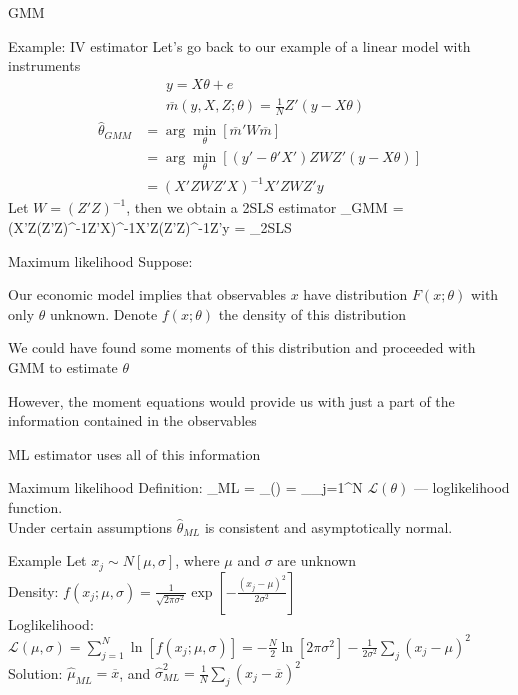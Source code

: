\begin{frame}{GMM}
	\begin{block}{Example: IV estimator}
	Let's go back to our example of a linear model with instruments
	\begin{align*}
		&y = X\theta + e\\
		&\overline{m}(y, X,Z; \theta) = \frac{1}{N}Z'(y-X\theta)
	\end{align*}
	\begin{align*}
		\widehat{\theta}_{GMM} &= \arg\min_\theta\left[\overline{m}'W\overline{m}\right]\\
		&= \arg\min_\theta\left[(y'-\theta'X')ZWZ'(y-X\theta)\right]\\
		& = \left(X'ZWZ'X\right)^{-1}X'ZWZ'y
	\end{align*}
	Let $W = \left(Z'Z\right)^{-1}$, then we obtain a 2SLS estimator
	\be
		\widehat{\theta}_{GMM} = \left(X'Z\left(Z'Z\right)^{-1}Z'X\right)^{-1}X'Z\left(Z'Z\right)^{-1}Z'y = \widehat\theta_{2SLS}
	\ee
	\end{block}
\end{frame}

\begin{frame}{Maximum likelihood}
	Suppose:
	\bi
		\item{Our economic model implies that observables $x$ have distribution $F(x;\theta)$ with only $\theta$ unknown. Denote $f(x; \theta)$ the density of this distribution}
		\item{We could have found some moments of this distribution and proceeded with GMM to estimate $\theta$}
		\item{However, the moment equations would provide us with just a part of the information contained in the observables}
		\item{ML estimator uses all of this information}
	\ei
\end{frame}

\begin{frame}{Maximum likelihood}
	Definition:
	\be
		\widehat{\theta}_{ML} = \arg\max_\theta{}(\theta) = \arg\max_\theta\sum_{j=1}^N\ln{}
	\ee
	$\mathcal{L}(\theta)$ --- loglikelihood function.\\\bigskip
	Under certain assumptions $\widehat{\theta}_{ML}$ is consistent and asymptotically normal.
	\begin{block}{Example}
		Let $x_j \sim N[\mu, \sigma]$, where $\mu$ and $\sigma$ are unknown\\\medskip
		Density: $f(x_j; \mu, \sigma) = \frac{1}{\sqrt{2\pi\sigma^2}}\exp\left[-\frac{(x_j - \mu)^2}{2\sigma^2}\right]$\\\medskip
		Loglikelihood: $\mathcal{L}(\mu, \sigma) = \sum_{j=1}^N\ln\left[f(x_j;\mu, \sigma)\right] = - \frac{N}{2}\ln\left[2\pi\sigma^2\right] - \frac{1}{2\sigma^2}\sum_j(x_j - \mu)^2$\\\medskip
		Solution: $\widehat{\mu}_{ML} = \overline{x}$, and $\widehat{\sigma}^2_{ML} = \frac{1}{N}\sum_j(x_j - \overline{x})^2$
	\end{block}
\end{frame}

